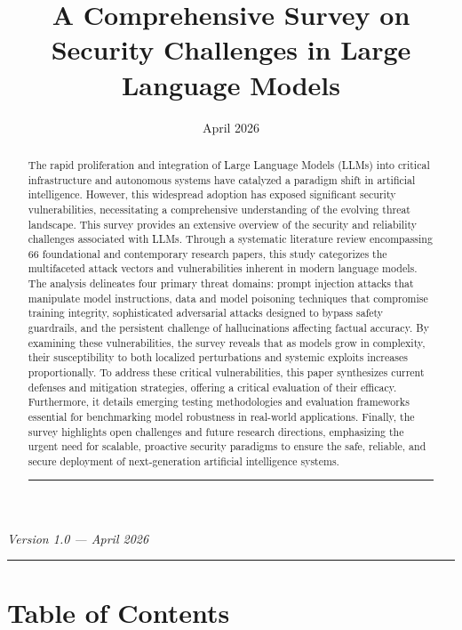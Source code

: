 \documentclass[11pt,a4paper]{article}
\title{A Comprehensive Survey on Security Challenges in Large Language Models}
\author{}
\date{April 2026}
\begin{document}
\maketitle

\begin{abstract}
The rapid proliferation and integration of Large Language Models (LLMs) into critical infrastructure and autonomous systems have catalyzed a paradigm shift in artificial intelligence. However, this widespread adoption has exposed significant security vulnerabilities, necessitating a comprehensive understanding of the evolving threat landscape. This survey provides an extensive overview of the security and reliability challenges associated with LLMs. Through a systematic literature review encompassing 66 foundational and contemporary research papers, this study categorizes the multifaceted attack vectors and vulnerabilities inherent in modern language models. The analysis delineates four primary threat domains: prompt injection attacks that manipulate model instructions, data and model poisoning techniques that compromise training integrity, sophisticated adversarial attacks designed to bypass safety guardrails, and the persistent challenge of hallucinations affecting factual accuracy. By examining these vulnerabilities, the survey reveals that as models grow in complexity, their susceptibility to both localized perturbations and systemic exploits increases proportionally. To address these critical vulnerabilities, this paper synthesizes current defenses and mitigation strategies, offering a critical evaluation of their efficacy. Furthermore, it details emerging testing methodologies and evaluation frameworks essential for benchmarking model robustness in real-world applications. Finally, the survey highlights open challenges and future research directions, emphasizing the urgent need for scalable, proactive security paradigms to ensure the safe, reliable, and secure deployment of next-generation artificial intelligence systems.

\noindent\rule{\textwidth}{0.4pt}
\end{abstract}


\textit{Version 1.0 --- April 2026}

\noindent\rule{\textwidth}{0.4pt}
\section{Table of Contents}
\end{document}
